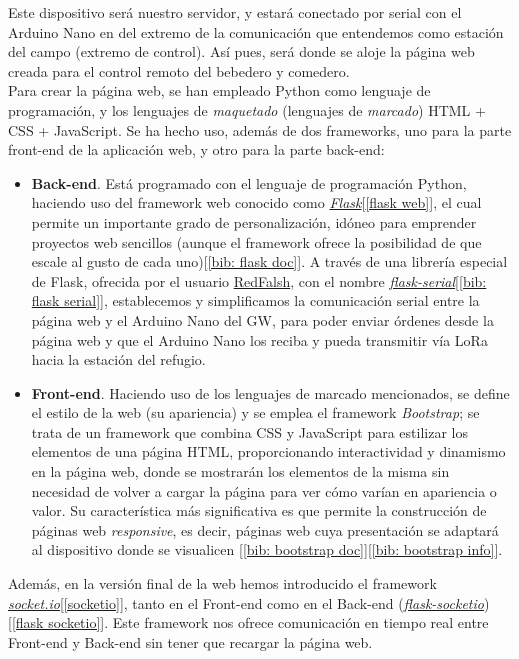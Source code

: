 \documentclass[12pt]{article}
\begin{document}
	\noindent Este dispositivo será nuestro servidor, y estará conectado por serial con el Arduino Nano en del extremo de la comunicación que entendemos como estación del campo (extremo de control). Así pues, será donde se aloje la página web creada para el control remoto del bebedero y comedero. \\
	
	\noindent Para crear la página web, se han empleado Python como lenguaje de programación, y los lenguajes de \textit{maquetado} (lenguajes de \textit{marcado}) HTML + CSS + JavaScript. Se ha hecho uso, además de dos frameworks, uno para la parte front-end de la aplicación web, y otro para la parte back-end:
	
	\begin{itemize}
		\item \textbf{Back-end}. Está programado con el lenguaje de programación Python, haciendo uso del framework web conocido como \href{https://flask.palletsprojects.com/en/2.0.x/}{\textit{Flask}}[\ref{flask web}], el cual permite un importante grado de personalización, idóneo para emprender proyectos web sencillos (aunque el framework ofrece la posibilidad de que escale al gusto de cada uno)[\ref{bib: flask doc}]. A través de una librería especial de Flask, ofrecida por el usuario \href{https://github.com/RedFalsh}{RedFalsh}, con el nombre \href{https://github.com/RedFalsh/flask-serial/blob/master/README.md}{\textit{flask-serial}}[\ref{bib: flask serial}], establecemos y simplificamos la comunicación serial entre la página web y el Arduino Nano del GW, para poder enviar órdenes desde la página web y que el Arduino Nano los reciba y pueda transmitir vía LoRa hacia la estación del refugio. 
		\item \textbf{Front-end}. Haciendo uso de los lenguajes de marcado mencionados, se define el estilo de la web (su apariencia) y se emplea el framework \textit{Bootstrap}; se trata de un framework que combina CSS y JavaScript  para estilizar los elementos  de una página HTML, proporcionando interactividad  y dinamismo en la página web, donde se mostrarán los elementos de la misma sin necesidad de volver a cargar la página para ver cómo varían en apariencia o valor. Su característica más significativa es que permite la construcción de páginas web \textit{responsive}, es decir, páginas web cuya presentación se adaptará al dispositivo donde se visualicen [\ref{bib: bootstrap doc}][\ref{bib: bootstrap info}].
	\end{itemize} 
	
	\noindent Además, en la versión final de la web hemos introducido el framework \href{https://socket.io/}{\textit{socket.io}}[\ref{socketio}], tanto en el Front-end como en el Back-end (\href{https://flask-socketio.readthedocs.io/en/latest/}{\textit{flask-socketio}})[\ref{flask socketio}]. Este framework nos ofrece comunicación en tiempo real entre Front-end y Back-end sin tener que recargar la página web.\\ 
	
\end{document}
